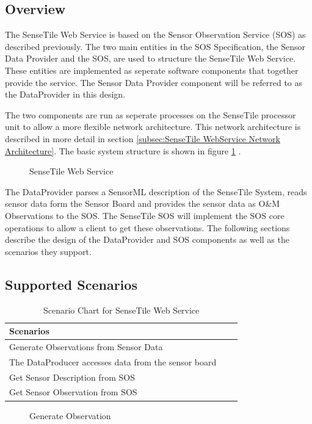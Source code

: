 \documentclass[]{final_report}
\begin{document}
\subsection{Overview}

The SenseTile Web Service is based on the Sensor Observation Service (SOS) as described previously. The two main entities in the SOS Specification, the Sensor Data Provider and the SOS,  are used to structure the SenseTile Web Service. These entities are implemented as seperate software components that together provide the service. The Sensor Data Provider component will be referred to as the DataProvider in this design.

The two components are run as seperate processes on the SenseTile processor unit to allow a more flexible network architecture.  This network architecture is described in more detail in section \ref{subsec:SenseTile WebService Network Architecture}. The basic system structure is shown in figure \ref {fig:Deployment_sensetile} .

\begin{figure}[h]
\caption{SenseTile Web Service}\label{fig:Deployment_sensetile}
\end{figure}

The DataProvider parses a SensorML description of the SenseTile System, reads sensor data form the Sensor Board and provides the sensor data as O\&M Observations to the SOS. The SenseTile SOS will implement the SOS core operations to allow a client to get these observations. The following sections describe the design of the DataProvider and SOS components as well as the scenarios they support.

\subsection{Supported Scenarios}
\begin{table}[!th]
\begin{tabular}{|l|c|r|}
\hline
Scenarios\\
\hline
Generate Observations from Sensor Data \\
The DataProducer accesses data from the sensor board \\
\hline
Get Sensor Description from SOS\\
\hline
Get  Sensor Observation from SOS\\
\hline
\end{tabular}
\caption{Scenario Chart for SenseTile Web Service}
\label{ex:table}
\end{table}
\begin{figure}[h]
\caption{Generate Observation}\label{fig:InsertObs}
\end{figure}
\end{document}
